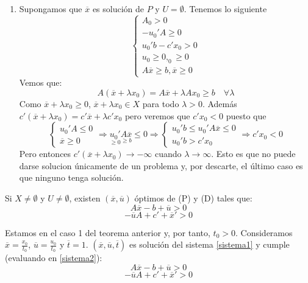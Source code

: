 \documentclass[PM.tex]{subfiles}
\begin{document}
\begin{dem}
\begin{enumerate}
\begin{enumerate}
	\item Supongamos que $\overline{x}$ es solución de $P$ y $U = \emptyset$. Tenemos lo siguiente
	\[ \begin{cases}A_0 > 0 \\ -u_0'A ≥ 0 \\ u_0'b-c'x_0 > 0 \\ u_0 ≥ 0, _0 ≥ 0\\ A\overline{x} ≥ b,\overline{x}≥ 0\end{cases} \]
	Vemos que:
	\[ A(\overline{x} + λx_0) = A\overline{x} + λ A x_0 ≥ b \quad \forall λ\]
	Como $\overline{x} + λ x_0 ≥ 0$, $\overline{x} + λ x_0 \in X$ para todo $λ > 0$. Además $c'(\overline{x} + λ x_0) = c'\overline{x} + λ c' x_0$ pero veremos que $c'x_0 < 0$ puesto que
	\[ \begin{cases}u_0'A ≤ 0\\\overline{x} ≥ 0\end{cases} \Rightarrow \underset{≥0}{u_0'}\underset{≥b}{A\overline{x}} ≤ 0 \Rightarrow \begin{cases}u_0'b ≤ u_0'A\overline{x} ≤ 0\\u_0'b > c'x_0\end{cases} \Rightarrow c'x_0 < 0\]
	Pero entonces $c'(\overline{x} + λ x_0) \to -\infty$ cuando $λ \to \infty$. Esto es que no puede darse solucion únicamente de un problema y, por descarte, el último caso es que ninguno tenga solución.
	\end{enumerate}
\end{enumerate}
\end{dem}

\begin{theorem}
Si $X \neq \emptyset$ y $U \neq \emptyset$, existen $(\overline{x},\overline{u})$ óptimos de (P) y (D) tales que:
\[ A\overline{x} -b + \overline{u} > 0\]
\[ -\overline{u}A + c' +\overline{x}' > 0\]
\end{theorem}

\begin{dem}
Estamos en el caso 1 del teorema anterior y, por tanto, $t_0 > 0$. Consideramos $\overline{x} = \frac{x_0}{t_0}$, $\overline{u}=\frac{u_0}{t_0}$ y $\overline{t} = 1$. $(\overline{x},\overline{u},\overline{t})$ es solución del sistema \eqref{sistema1} y cumple (evaluando en \eqref{sistema2}):
\[ A\overline{x} -b + \overline{u} > 0\]
\[ -\overline{u}A + c' +\overline{x}' > 0\]
\end{dem}
\end{document}
